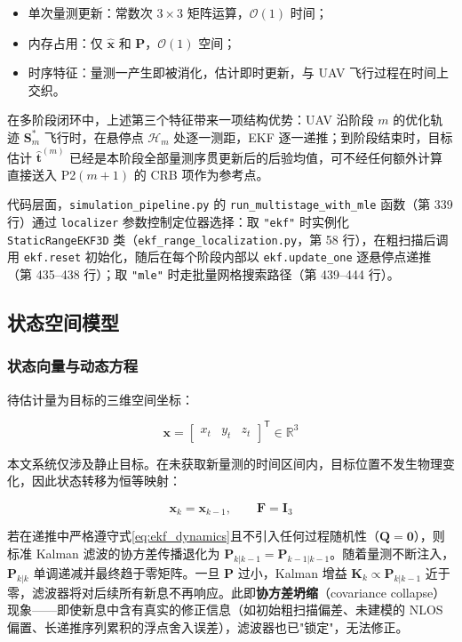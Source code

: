 \begin{itemize}
    \item 单次量测更新：常数次 $3 \times 3$ 矩阵运算，$\mathcal{O}(1)$ 时间；
    \item 内存占用：仅 $\hat{\mathbf{x}}$ 和 $\mathbf{P}$，$\mathcal{O}(1)$ 空间；
    \item 时序特征：量测一产生即被消化，估计即时更新，与 UAV 飞行过程在时间上交织。
\end{itemize}

在多阶段闭环中，上述第三个特征带来一项结构优势：UAV 沿阶段 $m$ 的优化轨迹 $\mathbf{S}_m^*$ 飞行时，在悬停点 $\mathcal{H}_m$ 处逐一测距，EKF 逐一递推；到阶段结束时，目标估计 $\hat{\mathbf{t}}^{(m)}$ 已经是本阶段全部量测序贯更新后的后验均值，可不经任何额外计算直接送入 P2$(m+1)$ 的 CRB 项作为参考点。

代码层面，\texttt{simulation\_pipeline.py} 的 \texttt{run\_multistage\_with\_mle} 函数（第 339 行）通过 \texttt{localizer} 参数控制定位器选择：取 \texttt{"ekf"} 时实例化 \texttt{StaticRangeEKF3D} 类（\texttt{ekf\_range\_localization.py}，第 58 行），在粗扫描后调用 \texttt{ekf.reset} 初始化，随后在每个阶段内部以 \texttt{ekf.update\_one} 逐悬停点递推（第 435--438 行）；取 \texttt{"mle"} 时走批量网格搜索路径（第 439--444 行）。

\subsection{状态空间模型}

\subsubsection{状态向量与动态方程}

待估计量为目标的三维空间坐标：

\begin{equation}
\mathbf{x} = \begin{bmatrix} x_t & y_t & z_t \end{bmatrix}^{\mathsf{T}} \in \mathbb{R}^3
\label{eq:ekf_x}
\end{equation}

本文系统仅涉及静止目标。在未获取新量测的时间区间内，目标位置不发生物理变化，因此状态转移为恒等映射：

\begin{equation}
\mathbf{x}_k = \mathbf{x}_{k-1}, \qquad \mathbf{F} = \mathbf{I}_3
\label{eq:ekf_dynamics}
\end{equation}

若在递推中严格遵守式\eqref{eq:ekf_dynamics}且不引入任何过程随机性（$\mathbf{Q} = \mathbf{0}$），则标准 Kalman 滤波的协方差传播退化为 $\mathbf{P}_{k|k-1} = \mathbf{P}_{k-1|k-1}$。随着量测不断注入，$\mathbf{P}_{k|k}$ 单调递减并最终趋于零矩阵。一旦 $\mathbf{P}$ 过小，Kalman 增益 $\mathbf{K}_k \propto \mathbf{P}_{k|k-1}$ 近于零，滤波器将对后续所有新息不再响应。此即\textbf{协方差坍缩}（covariance collapse）现象——即使新息中含有真实的修正信息（如初始粗扫描偏差、未建模的 NLOS 偏置、长递推序列累积的浮点舍入误差），滤波器也已"锁定"，无法修正。

